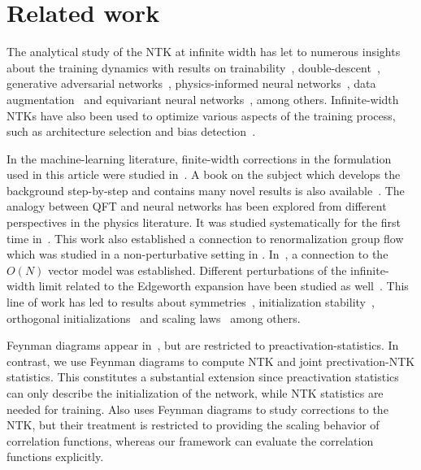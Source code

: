 \section{Related work}
The analytical study of the NTK at infinite width has let to numerous insights about the training dynamics with results on trainability~\cite{xiao2020}, double-descent~\cite{geiger2020a}, generative adversarial networks~\cite{franceschi2022}, physics-informed neural networks~\cite{wang2022b}, data augmentation~\cite{gerken2024} and equivariant neural networks~\cite{misof2025}, among others. Infinite-width NTKs have also been used to optimize various aspects of the training process, such as architecture selection and bias detection~\cite{deoliveira2025}.

In the machine-learning literature, finite-width corrections in the formulation used in this article were studied in~\cite{yaida2020}. A book on the subject which develops the background step-by-step and contains many novel results is also available~\cite{roberts2022}. The analogy between QFT and neural networks has been explored from different perspectives in the physics literature. It was studied systematically for the first time in~\cite{halverson2021}. This work also established a connection to renormalization group flow which was studied in a non-perturbative setting in \cite{erbin2022}. In~\cite{grosvenor2022}, a connection to the $O(N)$ vector model was established. Different perturbations of the infinite-width limit related to the Edgeworth expansion have been studied as well~\cite{demirtas2024}. This line of work has led to results about symmetries~\cite{maiti2021}, initialization stability~\cite{banta2024}, orthogonal initializations~\cite{day2023} and scaling laws~\cite{maloney2022, zhang2025} among others.

Feynman diagrams appear in~\cite{banta2024, halverson2021, grosvenor2022, demirtas2024, maloney2022, zhang2025}, but are restricted to preactivation-statistics. In contrast, we use Feynman diagrams to compute NTK and joint prectivation-NTK statistics. This constitutes a substantial extension since preactivation statistics can only describe the initialization of the network, while NTK statistics are needed for training. Also \cite{dyer2019} uses Feynman diagrams to study corrections to the NTK, but their treatment is restricted to providing the scaling behavior of correlation functions, whereas our framework can evaluate the correlation functions explicitly.


